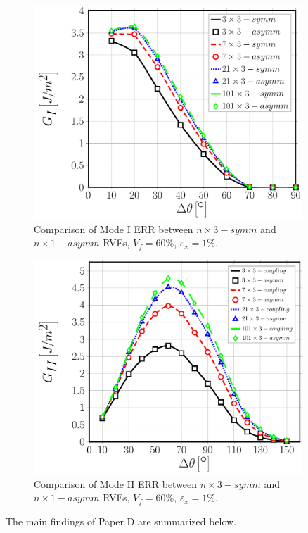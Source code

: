 \begin{figure}[!htb]
\centering
  \includegraphics[width=0.9\textwidth]{paperD/nxk-coupling-vf60-GI.pdf}
\caption{Comparison of Mode I ERR between $n \times 3-symm$ and $n \times 1-asymm$ RVEs, $V_{f}=60\%$, $\varepsilon_{x}=1\%$.}\label{chap3:paperD:fig:nxk-GI}
\end{figure}

\begin{figure}[!htb]
\centering
  \includegraphics[width=0.9\textwidth]{paperD/nxk-coupling-vf60-GII.pdf}
\caption{Comparison of Mode II ERR between $n \times 3-symm$ and $n \times 1-asymm$ RVEs, $V_{f}=60\%$, $\varepsilon_{x}=1\%$.}\label{chap3:paperD:fig:nxk-GII}
\end{figure}

The main findings of Paper D are summarized below.

